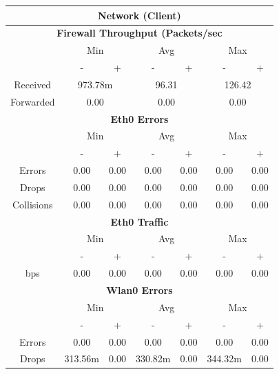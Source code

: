 \documentclass[11pt,a4paper]{scrreprt}
\begin{document}
\begin{table}[H]
\centering
    \begin{tabular}{||c|c|c|c|c|c|c||}
    \hline
    \multicolumn{7}{|c|}{\textbf{Network (Client)}} \\
    \hline
    \multicolumn{7}{|c|}{\textbf{Firewall Throughput (Packets/sec}} \\
    \hline\hline
      & \multicolumn{2}{|c|}{Min} & \multicolumn{2}{|c|}{Avg} & \multicolumn{2}{|c|}{Max} \\
    \hline\hline
      & - & + & - & + & - & + \\
    \hline
    Received & \multicolumn{2}{|c|}{973.78m} & \multicolumn{2}{|c|}{96.31} & \multicolumn{2}{|c|}{126.42} \\
    \hline
    Forwarded & \multicolumn{2}{|c|}{0.00} & \multicolumn{2}{|c|}{0.00} & \multicolumn{2}{|c|}{0.00} \\
    \hline\hline
    \multicolumn{7}{|c|}{\textbf{Eth0 Errors}} \\
    \hline\hline
      & \multicolumn{2}{|c|}{Min} & \multicolumn{2}{|c|}{Avg} & \multicolumn{2}{|c|}{Max} \\
    \hline
     & - & + & - & + & - & + \\
    \hline
    Errors & 0.00 & 0.00 & 0.00 & 0.00 & 0.00 & 0.00 \\
    \hline
    Drops & 0.00 & 0.00 & 0.00 & 0.00 & 0.00 & 0.00 \\
    \hline
    Collisions & 0.00 & 0.00 & 0.00 & 0.00 & 0.00 & 0.00 \\
    \hline\hline
    \multicolumn{7}{|c|}{\textbf{Eth0 Traffic}} \\
    \hline\hline
      & \multicolumn{2}{|c|}{Min} & \multicolumn{2}{|c|}{Avg} & \multicolumn{2}{|c|}{Max} \\
    \hline
      & - & + & - & + & - & + \\
    \hline
    bps & 0.00 & 0.00 & 0.00 & 0.00 & 0.00 & 0.00 \\
    \hline\hline
    \multicolumn{7}{|c|}{\textbf{Wlan0 Errors}} \\
    \hline\hline
      & \multicolumn{2}{|c|}{Min} & \multicolumn{2}{|c|}{Avg} & \multicolumn{2}{|c|}{Max} \\
    \hline
      & - & + & - & + & - & + \\
    \hline
    Errors  & 0.00 & 0.00 & 0.00 & 0.00 & 0.00 & 0.00 \\
    \hline
    Drops & 313.56m & 0.00 & 330.82m & 0.00 & 344.32m & 0.00 \\

\end{tabular}
\end{table}
\end{document}
